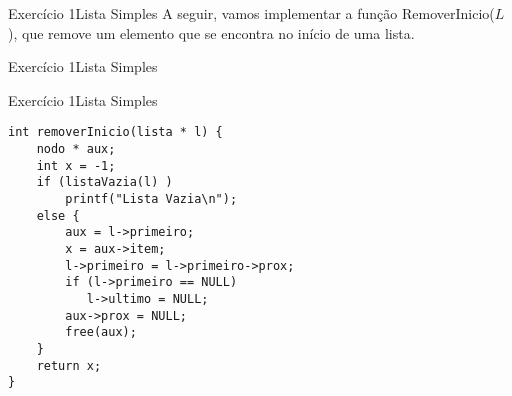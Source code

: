 \documentclass[aspectratio=169]{beamer}
\begin{document}

\begin{frame}[fragile]{Exercício 1}{Lista Simples}
A seguir, vamos implementar a função RemoverInicio($L$), que remove um elemento que se encontra no início de uma lista.
\end{frame}


\begin{frame}[fragile]{Exercício 1}{Lista Simples}
\end{frame}


\begin{frame}[fragile]{Exercício 1}{Lista Simples}
\begin{lstlisting}[style=CStyle]
int removerInicio(lista * l) {
    nodo * aux;
    int x = -1;
    if (listaVazia(l) )
        printf("Lista Vazia\n");
    else {
        aux = l->primeiro;
        x = aux->item;
        l->primeiro = l->primeiro->prox;
        if (l->primeiro == NULL)
           l->ultimo = NULL;
        aux->prox = NULL;
        free(aux);
    }
    return x;
}
\end{lstlisting}  
\end{frame}
\end{document}
